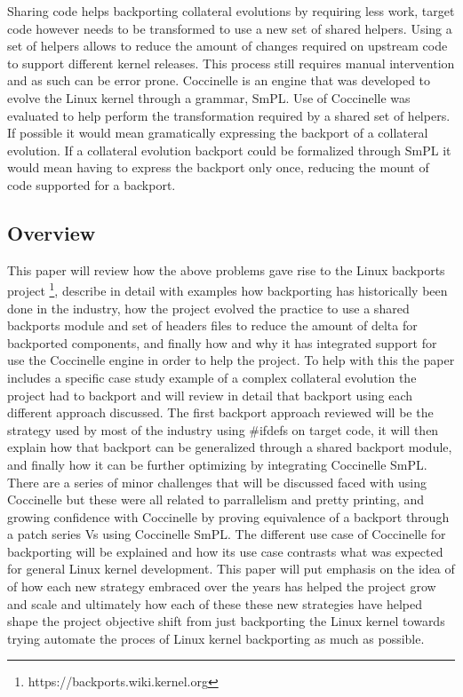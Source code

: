 Sharing code helps backporting collateral evolutions by requiring less work,
target code however needs to be transformed to use a new set of shared helpers.
Using a set of helpers allows to reduce the amount of changes required on
upstream code to support different kernel releases.  This process still
requires manual intervention and as such can be error prone.  Coccinelle is an
engine that was developed to evolve the Linux kernel through a grammar, SmPL.
Use of Coccinelle was evaluated to help perform the transformation required by
a shared set of helpers. If possible it would mean gramatically expressing
the backport of a collateral evolution. If a collateral evolution backport
could be formalized through SmPL it would mean having to express the backport
only once, reducing the mount of code supported for a backport.

\subsection{Overview}

This paper will review how the above problems gave rise to the Linux backports
project \footnote{https://backports.wiki.kernel.org}, describe in detail with
examples how backporting has historically been done in the industry, how the
project evolved the practice to use a shared backports module and set of
headers files to reduce the amount of delta for backported components, and
finally how and why it has integrated support for use the Coccinelle engine in
order to help the project. To help with this the paper includes a specific case
study example of a complex collateral evolution the project had to backport and
will review in detail that backport using each different approach discussed.
The first backport approach reviewed will be the strategy used by most of the
industry using \#ifdefs on target code, it will then explain how that backport
can be generalized through a shared backport module, and finally how it can be
further optimizing by integrating Coccinelle SmPL. There are a series of minor
challenges that will be discussed faced with using Coccinelle but these were
all related to parrallelism and pretty printing, and growing confidence with
Coccinelle by proving equivalence of a backport through a patch series Vs using
Coccinelle SmPL. The different use case of Coccinelle for backporting will be
explained and how its use case contrasts what was expected for general Linux
kernel development. This paper will put emphasis on the idea of of how each new
strategy embraced over the years has helped the project grow and scale and
ultimately how each of these these new strategies have helped shape the project
objective shift from just backporting the Linux kernel towards trying automate
the proces of Linux kernel backporting as much as possible.
